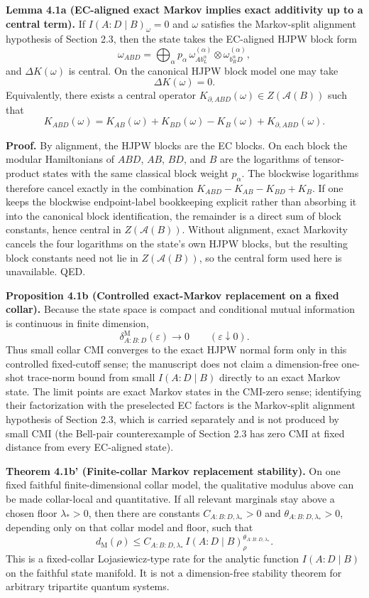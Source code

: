 \textbf{Lemma 4.1a (EC-aligned exact Markov implies exact additivity up to a central term).} If \(I(A:D \mid B)_\omega = 0\) and \(\omega\) satisfies the Markov-split alignment hypothesis of Section 2.3, then the state takes the EC-aligned HJPW block form
\[
\omega_{ABD}
=
\bigoplus_{\alpha}
p_{\alpha}\,
\omega^{(\alpha)}_{A b_L^{\alpha}}
\otimes
\omega^{(\alpha)}_{b_R^{\alpha} D},
\]
and \(\Delta K(\omega)\) is central. On the canonical HJPW block model one may take
\[
\Delta K(\omega)=0.
\]
Equivalently, there exists a central operator \(K_{\partial,ABD}(\omega)\in Z(\mathcal A(B))\) such that
\[
K_{ABD}(\omega)
=
K_{AB}(\omega)+K_{BD}(\omega)-K_B(\omega)+K_{\partial,ABD}(\omega).
\]

\textbf{Proof.} By alignment, the HJPW blocks are the EC blocks. On each block the modular Hamiltonians of \(ABD\), \(AB\), \(BD\), and \(B\) are the logarithms of tensor-product states with the same classical block weight \(p_\alpha\). The blockwise logarithms therefore cancel exactly in the combination \(K_{ABD}-K_{AB}-K_{BD}+K_B\). If one keeps the blockwise endpoint-label bookkeeping explicit rather than absorbing it into the canonical block identification, the remainder is a direct sum of block constants, hence central in \(Z(\mathcal A(B))\). Without alignment, exact Markovity cancels the four logarithms on the state's own HJPW blocks, but the resulting block constants need not lie in \(Z(\mathcal A(B))\), so the central form used here is unavailable. QED.

\textbf{Proposition 4.1b (Controlled exact-Markov replacement on a fixed collar).}
Because the state space is compact and conditional mutual information is continuous in finite dimension,
\[
\delta^{\mathrm M}_{A:B:D}(\varepsilon)\longrightarrow 0
\qquad
(\varepsilon\downarrow0).
\]
Thus small collar CMI converges to the exact HJPW normal form only in this controlled fixed-cutoff sense; the manuscript does not claim a dimension-free one-shot trace-norm bound from small \(I(A:D\mid B)\) directly to an exact Markov state. The limit points are exact Markov states in the CMI-zero sense; identifying their factorization with the preselected EC factors is the Markov-split alignment hypothesis of Section 2.3, which is carried separately and is not produced by small CMI (the Bell-pair counterexample of Section 2.3 has zero CMI at fixed distance from every EC-aligned state).

\textbf{Theorem 4.1b' (Finite-collar Markov replacement stability).} On one fixed faithful
finite-dimensional collar model, the qualitative modulus above can be made collar-local and
quantitative. If all relevant marginals stay above a chosen floor \(\lambda_\ast>0\), then there are
constants \(C_{A:B:D,\lambda_\ast}>0\) and \(\theta_{A:B:D,\lambda_\ast}>0\), depending only on that
collar model and floor, such that
\[
d_{\mathrm M}(\rho)
\le
C_{A:B:D,\lambda_\ast}\,
I(A:D\mid B)_\rho^{\theta_{A:B:D,\lambda_\ast}}.
\]
This is a fixed-collar Lojasiewicz-type rate for the analytic function
\(I(A:D\mid B)\) on the faithful state manifold. It is not a dimension-free stability theorem for
arbitrary tripartite quantum systems.

